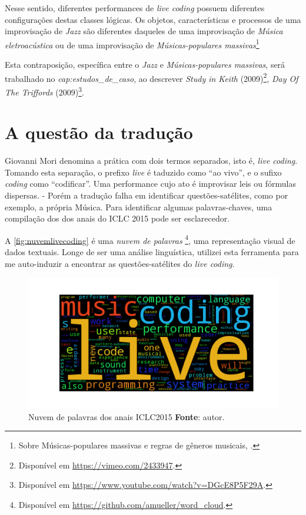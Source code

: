 Nesse sentido, diferentes performances de \emph{live coding} possuem diferentes configurações destas classes lógicas. Os objetos, características e processos de uma improvisação de \emph{Jazz} são diferentes daqueles de uma improvisação de \emph{Música eletroacústica} ou de uma improvisação de \emph{Músicas-populares massivas}\footnote{Sobre Músicas-populares massivas e regras de gêneros musicais, .}

Esta contraposição, específica entre o \emph{Jazz} e \emph{Músicas-populares massivas}, será trabalhado no \emph{cap:estudos_de_caso}, ao descrever \emph{Study in Keith} (2009)\footnote{Disponível em \url{https://vimeo.com/2433947}.}, \emph{Day Of The Triffords} (2009)\footnote{Disponível em \url{https://www.youtube.com/watch?v=DGcE8P5F29A}.}.

\section{A questão da tradução}\label{sec:traducao}

Giovanni Mori denomina a prática com dois termos separados, isto é, \emph{live coding}. Tomando esta separação, o prefixo \emph{live} é taduzido como ``ao vivo'', e o sufixo \emph{coding} como ``codificar''. Uma performance cujo ato é improvisar leis ou fórmulas dispersas.
-
Porém a tradução falha em identificar questões-satélites, como por exemplo, a própria Música. Para identificar algumas palavras-chaves, uma compilação dos dos anais do ICLC 2015 \cite{ICLC2015} pode ser esclarecedor.

A \autoref{fig:nuvemlivecoding} é uma \emph{nuvem de palavras} \footnote{Disponível em \url{https://github.com/amueller/word_cloud}.}, uma representação visual de dados textuais. Longe de ser uma análise linguística, utilizei esta ferramenta para me auto-induzir a encontrar as questões-satélites do \emph{live coding}.

\begin{figure}[!h]
\begin{center}
\centering
\includegraphics[scale=0.71]{./imagens/livecoding_cloud1.png}
\caption{Nuvem de palavras dos anais ICLC2015 \textbf{Fonte}: autor.}
\label{fig:nuvemlivecoding}
\end{center}
\end{figure}

